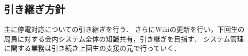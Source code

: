\subsection*{引き継ぎ方針}

主に停電対応についての引き継ぎを行う．
さらにWikiの更新を行い，下回生の局員に対する会内システム全体の知識共有，引き継ぎを目指す．
システム管理に関する業務は引き続き上回生の支援の元で行っていく．
